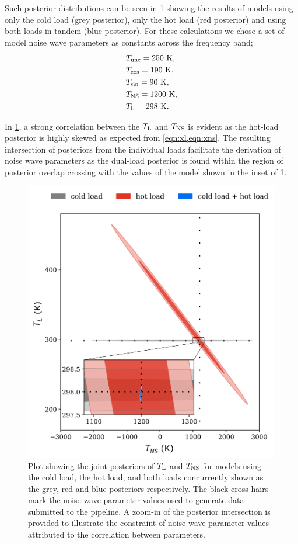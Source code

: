 Such posterior distributions can be seen in \cref{fig:goodplot} showing the results of models using only the cold load (grey posterior), only the hot load (red posterior) and using both loads in tandem (blue posterior). For these calculations we chose a set of model noise wave parameters as constants across the frequency band;
\begin{align*}
    & T_{\mathrm{unc}} = 250 \ \mathrm{K}, \\
    & T_{\mathrm{cos}} = 190 \ \mathrm{K}, \\
    & T_{\mathrm{sin}} = 90 \ \mathrm{K}, \\
    & T_{\mathrm{NS}} = 1200 \ \mathrm{K}, \\
    & T_{\mathrm{L}} = 298 \ \mathrm{K}.
\end{align*}

In \cref{fig:goodplot}, a strong correlation between the $T_{\mathrm{L}}$ and $T_{\mathrm{NS}}$ is evident as the hot-load posterior is highly skewed as expected from \cref{eqn:xl,eqn:xns}. The resulting intersection of posteriors from the individual loads facilitate the derivation of noise wave parameters as the dual-load posterior is found within the region of posterior overlap crossing with the values of the model shown in the inset of \cref{fig:goodplot}.
\begin{figure}
    \centering
    \includegraphics[width=.5\columnwidth]{goodplot}
    \caption{Plot showing the joint posteriors of $T_{\mathrm{L}}$ and $T_{\mathrm{NS}}$ for models using the cold load, the hot load, and both loads concurrently shown as the grey, red and blue posteriors respectively. The black cross hairs mark the noise wave parameter values used to generate data submitted to the pipeline. A zoom-in of the posterior intersection is provided to illustrate the constraint of noise wave parameter values attributed to the correlation between parameters. \label{fig:goodplot}}
\end{figure}


